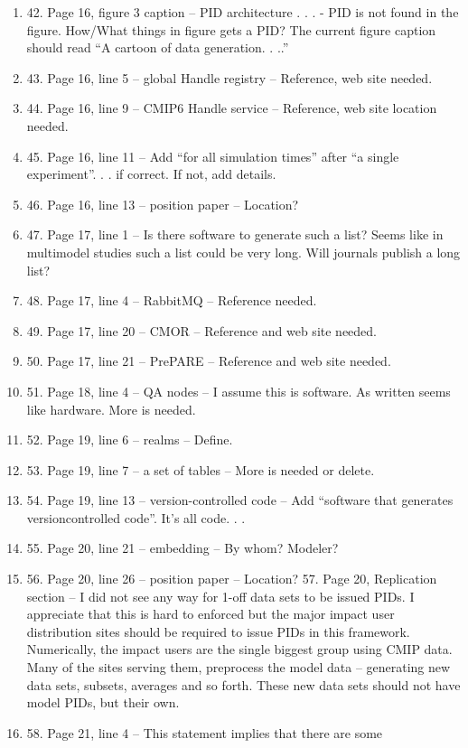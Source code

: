 \documentclass[gmd,manuscript]{copernicus}
\begin{document}
\begin{enumerate}[label=RC1-\arabic*,leftmargin=*]
\item 42. Page 16, figure 3 caption – PID architecture . . . - PID is
  not found in the figure. How/What things in figure gets a PID? The
  current figure caption should read “A cartoon of data generation. .
  ..”
\item 43. Page 16, line 5 – global Handle registry – Reference, web
  site needed.
\item 44. Page 16, line 9 – CMIP6 Handle service – Reference, web site
  location needed.
\item 45. Page 16, line 11 – Add “for all simulation times” after “a
  single experiment”. . . if correct. If not, add details.
\item 46. Page 16, line 13 – position paper – Location?
\item 47. Page 17, line 1 – Is there software to generate such a list?
  Seems like in multimodel studies such a list could be very long.
  Will journals publish a long list?
\item 48. Page 17, line 4 – RabbitMQ – Reference needed.
\item 49. Page 17, line 20 – CMOR – Reference and web site needed.
\item 50. Page 17, line 21 – PrePARE – Reference and web site needed.
\item 51. Page 18, line 4 – QA nodes – I assume this is software. As
  written seems like hardware. More is needed.
\item 52. Page 19, line 6 – realms – Define.
\item 53. Page 19, line 7 – a set of tables – More is needed or
  delete.
\item 54. Page 19, line 13 – version-controlled code – Add “software
  that generates versioncontrolled code”. It’s all code. . .
\item 55. Page 20, line 21 – embedding – By whom? Modeler?
\item 56. Page 20, line 26 – position paper – Location? 57. Page 20,
  Replication section – I did not see any way for 1-off data sets to
  be issued PIDs. I appreciate that this is hard to enforced but the
  major impact user distribution sites should be required to issue
  PIDs in this framework. Numerically, the impact users are the single
  biggest group using CMIP data. Many of the sites serving them,
  preprocess the model data – generating new data sets, subsets,
  averages and so forth. These new data sets should not have model
  PIDs, but their own.
\item 58. Page 21, line 4 – This statement implies that there are some

\end{enumerate}
\end{document}
